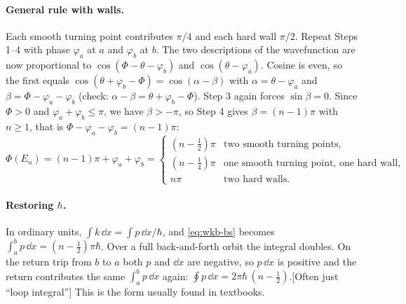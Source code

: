 \paragraph{General rule with walls.} Each smooth turning point contributes $\pi/4$ and each hard wall $\pi/2$. Repeat Steps 1--4 with phase $\varphi_a$ at $a$ and $\varphi_b$ at $b$. The two descriptions of the wavefunction are now proportional to $\cos(\Phi-\theta-\varphi_b)$ and $\cos(\theta-\varphi_a)$. Cosine is even, so the first equals $\cos(\theta+\varphi_b-\Phi)=\cos(\alpha-\beta)$ with $\alpha=\theta-\varphi_a$ and $\beta=\Phi-\varphi_a-\varphi_b$ (check: $\alpha-\beta=\theta+\varphi_b-\Phi$). Step 3 again forces $\sin\beta=0$. Since $\Phi>0$ and $\varphi_a+\varphi_b\le\pi$, we have $\beta>-\pi$, so Step 4 gives $\beta=(n-1)\pi$ with $n\ge1$, that is $\Phi-\varphi_a-\varphi_b=(n-1)\pi$:
\begin{equation}
\Phi(E_n)=(n-1)\pi+\varphi_a+\varphi_b=
\begin{cases}
(n-\tfrac12)\pi & \text{two smooth turning points},\\
(n-\tfrac14)\pi & \text{one smooth turning point, one hard wall},\\
n\pi & \text{two hard walls.}
\end{cases}
\label{eq:wkb-bsgeneral}
\end{equation}

\paragraph{Restoring $\hbar$.} In ordinary units, $\int k\,\dd x=\int p\,\dd x/\hbar$, and \cref{eq:wkb-bs} becomes $\int_a^b p\,\dd x=(n-\tfrac12)\pi\hbar$. Over a full back-and-forth orbit the integral doubles. On the return trip from $b$ to $a$ both $p$ and $\dd x$ are negative, so $p\,\dd x$ is positive and the return contributes the same $\int_a^bp\,\dd x$ again: $\oint p\,\dd x=2\pi\hbar\,(n-\tfrac12)$.[Often just ``loop integral''] This is the form usually found in textbooks.

